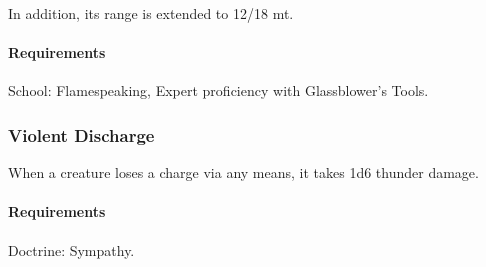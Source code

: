     In addition, its range is extended to 12/18 mt.
    \paragraph{Requirements} School: Flamespeaking, Expert proficiency with Glassblower's Tools.
\subsubsection{Violent Discharge} \label{feat::violentdischarge}
    When a creature loses a charge via any means, it takes 1d6 thunder damage.
    \paragraph{Requirements} Doctrine: Sympathy.

\newpage
